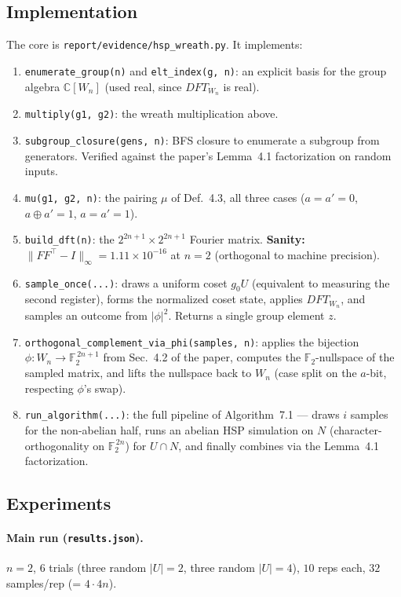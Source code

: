 \documentclass[11pt]{article}
\begin{document}
\subsection{Implementation}
The core is \texttt{report/evidence/hsp\_wreath.py}. It implements:
\begin{enumerate}
  \item \texttt{enumerate\_group(n)} and \texttt{elt\_index(g, n)}: an
        explicit basis for the group algebra $\mathbb C[W_n]$ (used real,
        since $DFT_{W_n}$ is real).
  \item \texttt{multiply(g1, g2)}: the wreath multiplication above.
  \item \texttt{subgroup\_closure(gens, n)}: BFS closure to enumerate a
        subgroup from generators. Verified against the paper's Lemma~4.1
        factorization on random inputs.
  \item \texttt{mu(g1, g2, n)}: the pairing $\mu$ of Def.\ 4.3, all three
        cases ($a=a'=0$, $a\oplus a'=1$, $a=a'=1$).
  \item \texttt{build\_dft(n)}: the $2^{2n+1}\times 2^{2n+1}$ Fourier
        matrix. \textbf{Sanity: $\|F F^{\top} - I\|_\infty = 1.11\times 10^{-16}$}
        at $n=2$ (orthogonal to machine precision).
  \item \texttt{sample\_once(...)}: draws a uniform coset $g_0 U$
        (equivalent to measuring the second register), forms the
        normalized coset state, applies $DFT_{W_n}$, and samples an
        outcome from $|\phi|^2$. Returns a single group element $z$.
  \item \texttt{orthogonal\_complement\_via\_phi(samples, n)}: applies
        the bijection $\phi : W_n \to \mathbb F_2^{\,2n+1}$ from Sec.~4.2
        of the paper, computes the $\mathbb F_2$-nullspace of the
        sampled matrix, and lifts the nullspace back to $W_n$ (case
        split on the $a$-bit, respecting $\phi$'s swap).
  \item \texttt{run\_algorithm(...)}: the full pipeline of Algorithm~7.1
        --- draws $i$ samples for the non-abelian half, runs an abelian
        HSP simulation on $N$ (character-orthogonality on $\mathbb F_2^{\,2n}$)
        for $U \cap N$, and finally combines via the Lemma~4.1
        factorization.
\end{enumerate}

\subsection{Experiments}
\paragraph{Main run (\texttt{results.json}).} $n=2$, $6$ trials
(three random $|U|=2$, three random $|U|=4$), $10$ reps each, $32$
samples/rep (= $4\cdot 4n$).
\end{document}
